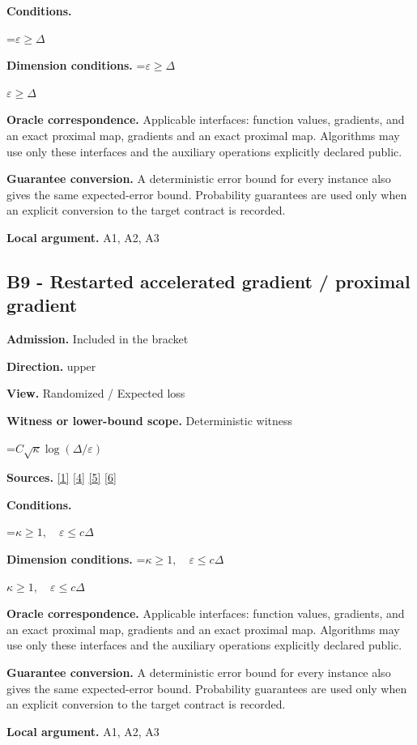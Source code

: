 \documentclass[10pt,a4paper]{article}
\newcommand{\AtlasMath}[1]{\par\begingroup\centering\setbox0=\hbox{$\displaystyle #1$}\ifdim\wd0>1.4\linewidth\typeout{ATLAS WIDE FORMULA: \the\wd0}\fi\ifdim\wd0>\linewidth\resizebox{\linewidth}{!}{\box0}\else\box0\fi\par\endgroup}
\newcommand{\AtlasInlineMath}[1]{\begingroup\setbox0=\hbox{$#1$}\ifdim\wd0>.4\linewidth\endgroup\AtlasMath{#1}\else\endgroup$#1$\fi}
\begin{document}
\textbf{Conditions.} 
\AtlasMath{\varepsilon\ge\Delta}


\textbf{Dimension conditions.} \AtlasInlineMath{\varepsilon\ge\Delta}

\textbf{Oracle correspondence.} Applicable interfaces: function values, gradients, and an exact proximal map, gradients and an exact proximal map. Algorithms may use only these interfaces and the auxiliary operations explicitly declared public.

\textbf{Guarantee conversion.} A deterministic error bound for every instance also gives the same expected-error bound. Probability guarantees are used only when an explicit conversion to the target contract is recorded.

\textbf{Local argument.} A1, A2, A3

\subsection{B9 - Restarted accelerated gradient / proximal gradient}
\textbf{Admission.} Included in the bracket

\textbf{Direction.} upper

\textbf{View.} Randomized / Expected loss

\textbf{Witness or lower-bound scope.} Deterministic witness

\AtlasMath{C\sqrt\kappa\log(\Delta/\varepsilon)}
\textbf{Sources.} \href{https://www.tau.ac.il/~becka/FISTA.pdf}{[1]} \href{https://arxiv.org/pdf/1405.4980}{[4]} \href{https://www2.isye.gatech.edu/~nemirovs/MOR_AccuracyCertificates.pdf}{[5]} \href{https://arxiv.org/pdf/2609.20701}{[6]}

\textbf{Conditions.} 
\AtlasMath{\kappa\ge1,\quad\varepsilon\le c\Delta}


\textbf{Dimension conditions.} \AtlasInlineMath{\kappa\ge1,\quad\varepsilon\le c\Delta}

\textbf{Oracle correspondence.} Applicable interfaces: function values, gradients, and an exact proximal map, gradients and an exact proximal map. Algorithms may use only these interfaces and the auxiliary operations explicitly declared public.

\textbf{Guarantee conversion.} A deterministic error bound for every instance also gives the same expected-error bound. Probability guarantees are used only when an explicit conversion to the target contract is recorded.

\textbf{Local argument.} A1, A2, A3
\end{document}

